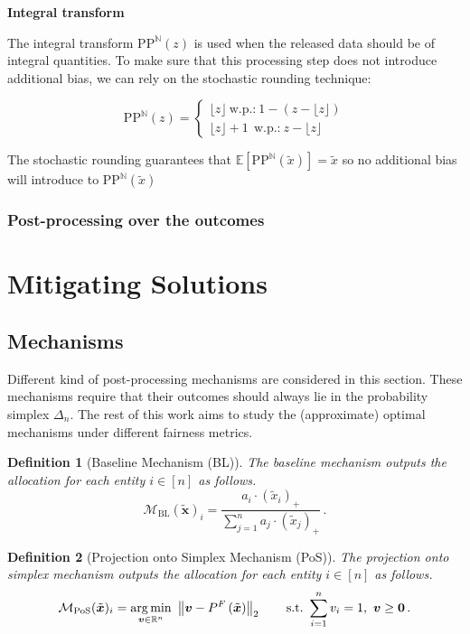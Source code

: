 \documentclass[9pt,twocolumn,twoside,lineno]{pnas-new}
\newtheorem{definition}{Definition}
\newcommand{\cM}{\mathcal{M}}
\newcommand{\noisyalloc}{\alloc{\noisydata}}
\newcommand{\noisydata}{\tilde{\bm{x}}}
\newcommand{\norm}[1]{\left\lVert#1\right\rVert}
\newcommand{\relu}[1]{\left(#1\right)_+}
\newcommand{\alloc}[1]{P^F\left(#1\right)}
\begin{document}
\noindent \textbf{Integral transform} 

The integral transform $\text{PP}^{\mathbb{N}}(z)$ is used when the released data should be of integral quantities. To make sure that this processing step does not introduce additional bias, we can rely on the stochastic rounding technique:

\begin{equation}
    \text{PP}^{\mathbb{N}}(z) = \begin{cases} \lfloor z \rfloor   \ \mbox{w.p.:} \  1 -(z- \lfloor z \rfloor ) \\
                               \lfloor z \rfloor  +1 \ \ \mbox{w.p.:} \  z - \lfloor z \rfloor 
    \end{cases}
\end{equation}


The stochastic rounding guarantees  that $\mathbb{E} [\text{PP}^{\mathbb{N}}(\tilde{x})] = \tilde{x} $ so no additional bias will introduce to $\text{PP}^{\mathbb{N}}(\tilde{x})$


\subsubsection*{Post-processing over the outcomes}

\section*{Mitigating Solutions}
\subsection*{Mechanisms}
    Different kind of post-processing mechanisms are considered in this section. These mechanisms
    require that
    their outcomes should always lie in the probability simplex $\Delta_n$. The rest of this work aims to study the (approximate) optimal mechanisms under different fairness metrics.
    \begin{definition}[Baseline Mechanism (BL)]
        The \emph{baseline mechanism} outputs the allocation for each entity $i\in [n]$ as follows.
        \begin{equation*}
            \cM_{\mathrm{BL}}(\noisydata)_i = \frac{a_i\cdot \relu{\tilde{x}_i}}{\sum_{j=1}^n a_j\cdot \relu{\tilde{x}_j}}\,.
        \end{equation*}
    \end{definition}
    
    \begin{definition}[Projection onto Simplex Mechanism (PoS)]
        The \emph{projection onto simplex mechanism} outputs the allocation for each entity $i\in [n]$ as follows.
        \begin{equation*}
            \cM_{\mathrm{PoS}}(\noisydata)_i= \underset{\bm{v}\in\RR^n}{\arg\min}~\norm{\bm{v}-\noisyalloc}_2\qquad\mathrm{s.t.}~
            \sum_{i=1}^n v_i = 1,~\bm{v}\geq \bm{0}\,.
        \end{equation*}
    \end{definition}


%   
%  
%
\end{document}
